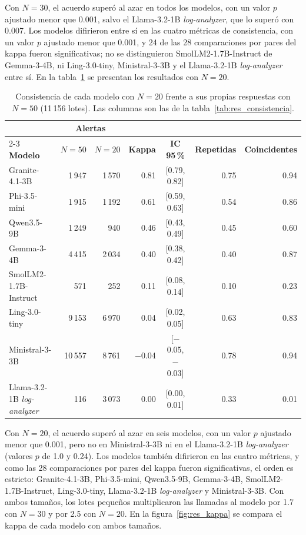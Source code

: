 Con $N = 30$, el acuerdo superó al azar en todos los modelos, con un valor $p$ ajustado menor que 0.001, salvo el Llama-3.2-1B \textit{log-analyzer}, que lo superó con 0.007. Los modelos difirieron entre sí en las cuatro métricas de consistencia, con un valor $p$ ajustado menor que 0.001, y 24 de las 28 comparaciones por pares del kappa fueron significativas; no se distinguieron SmolLM2-1.7B-Instruct de Gemma-3-4B, ni Ling-3.0-tiny, Ministral-3-3B y el Llama-3.2-1B \textit{log-analyzer} entre sí. En la tabla~\ref{tab:res_consistencia_n20} se presentan los resultados con $N = 20$.

\begin{table}[H]
\centering
\caption{Consistencia de cada modelo con $N = 20$ frente a sus propias respuestas con $N = 50$ (11\,156 lotes). Las columnas son las de la tabla~\ref{tab:res_consistencia}.}
\label{tab:res_consistencia_n20}
\small
\setlength{\tabcolsep}{4pt}
\begin{tabular}{@{}lrrrcrr@{}}
\toprule
 & \multicolumn{2}{c}{\textbf{Alertas}} & & & & \\
\cmidrule(lr){2-3}
\textbf{Modelo} & \textbf{$N = 50$} & \textbf{$N = 20$} & \textbf{Kappa} & \textbf{IC 95\,\%} & \textbf{Repetidas} & \textbf{Coincidentes} \\
\midrule
Granite-4.1-3B & 1\,947 & 1\,570 & 0.81 & [0.79, 0.82] & 0.75 & 0.94 \\
Phi-3.5-mini & 1\,915 & 1\,192 & 0.61 & [0.59, 0.63] & 0.54 & 0.86 \\
Qwen3.5-9B & 1\,249 & 940 & 0.46 & [0.43, 0.49] & 0.45 & 0.60 \\
Gemma-3-4B & 4\,415 & 2\,034 & 0.40 & [0.38, 0.42] & 0.40 & 0.87 \\
SmolLM2-1.7B-Instruct & 571 & 252 & 0.11 & [0.08, 0.14] & 0.10 & 0.23 \\
Ling-3.0-tiny & 9\,153 & 6\,970 & 0.04 & [0.02, 0.05] & 0.63 & 0.83 \\
Ministral-3-3B & 10\,557 & 8\,761 & $-$0.04 & [$-$0.05, $-$0.03] & 0.78 & 0.94 \\
Llama-3.2-1B \textit{log-analyzer} & 116 & 3\,073 & 0.00 & [0.00, 0.01] & 0.33 & 0.01 \\
\bottomrule
\end{tabular}
\normalsize
\end{table}

Con $N = 20$, el acuerdo superó al azar en seis modelos, con un valor $p$ ajustado menor que 0.001, pero no en Ministral-3-3B ni en el Llama-3.2-1B \textit{log-analyzer} (valores $p$ de 1.0 y 0.24). Los modelos también difirieron en las cuatro métricas, y como las 28 comparaciones por pares del kappa fueron significativas, el orden es estricto: Granite-4.1-3B, Phi-3.5-mini, Qwen3.5-9B, Gemma-3-4B, SmolLM2-1.7B-Instruct, Ling-3.0-tiny, Llama-3.2-1B \textit{log-analyzer} y Ministral-3-3B. Con ambos tamaños, los lotes pequeños multiplicaron las llamadas al modelo por 1.7 con $N = 30$ y por 2.5 con $N = 20$. En la figura~\ref{fig:res_kappa} se compara el kappa de cada modelo con ambos tamaños.


